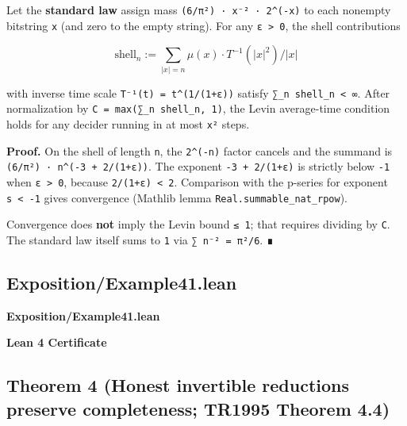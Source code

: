 \documentclass[11pt,a4paper]{article}
\begin{document}
Let the \textbf{standard law} assign mass \texttt{(6/π²)\ ·\ \textbar{}x\textbar{}⁻²\ ·\ 2\^{}(-\textbar{}x\textbar{})} to each nonempty bitstring \texttt{x} (and zero to the empty string). For any \texttt{ε\ \textgreater{}\ 0}, the shell contributions

\[
\text{shell}_n := \sum_{|x| = n} \mu(x) \cdot T^{-1}(|x|^2) / |x|
\]

with inverse time scale \texttt{T⁻¹(t)\ =\ t\^{}(1/(1+ε))} satisfy \texttt{∑\_n\ shell\_n\ \textless{}\ ∞}. After normalization by \texttt{C\ =\ max(∑\_n\ shell\_n,\ 1)}, the Levin average-time condition holds for any decider running in at most \texttt{\textbar{}x\textbar{}²} steps.

\textbf{Proof.} On the shell of length \texttt{n}, the \texttt{2\^{}(-n)} factor cancels and the summand is \texttt{(6/π²)\ ·\ n\^{}(-3\ +\ 2/(1+ε))}. The exponent \texttt{-3\ +\ 2/(1+ε)} is strictly below \texttt{-1} when \texttt{ε\ \textgreater{}\ 0}, because \texttt{2/(1+ε)\ \textless{}\ 2}. Comparison with the p-series for exponent \texttt{s\ \textless{}\ -1} gives convergence (Mathlib lemma \texttt{Real.summable\_nat\_rpow}).

Convergence does \textbf{not} imply the Levin bound \texttt{≤\ 1}; that requires dividing by \texttt{C}. The standard law itself sums to \texttt{1} via \texttt{∑\ n⁻²\ =\ π²/6}. ∎

\hypertarget{exposition-example41-lean}{%
\subsection{Exposition/Example41.lean}\label{exposition-example41-lean}}

\noindent\textbf{Exposition/Example41.lean}

\vspace{0.75\baselineskip}
\noindent\textcolor{green!40!black}{\textbf{Lean 4 Certificate}}\par\vspace{0.25\baselineskip}

\vspace{0.75\baselineskip}

\hypertarget{theorem-4-honest-invertible-reductions-preserve-completeness-tr1995-theorem-4.4}{%
\subsection{Theorem 4 (Honest invertible reductions preserve completeness; TR1995 Theorem 4.4)}\label{theorem-4-honest-invertible-reductions-preserve-completeness-tr1995-theorem-4.4}}
\end{document}
